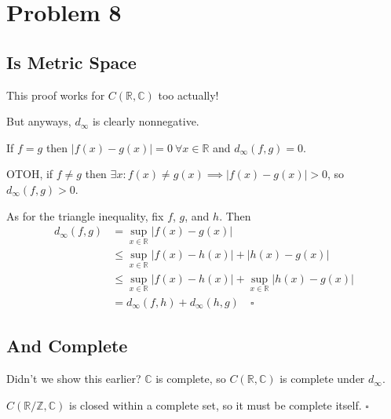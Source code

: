 \documentclass[12pt]{article}
\newcommand{\R}{\mathbb{R}}
\newcommand{\Z}{\mathbb{Z}}
\newcommand{\C}{\mathbb{C}}
\begin{document}
\section{Problem 8}

\subsection{Is Metric Space}

This proof works for $C(\R, \C)$ too actually!

But anyways, $d_\infty$ is clearly nonnegative.

If $f=g$ then $|f(x)-g(x)|=0\ \forall x \in \R$ and $d_\infty(f, g)=0$.

OTOH, if $f \ne g$ then $\exists x: f(x) \ne g(x) \implies |f(x)-g(x)| > 0$, so $d_\infty(f, g) > 0$.

As for the triangle inequality, fix $f$, $g$, and $h$.
Then
\begin{align*}
  d_\infty(f, g)
  &= \sup_{x \in \R} |f(x)-g(x)| \\
  &\le \sup_{x \in \R} |f(x)-h(x)|+|h(x)-g(x)| \\
  &\le \sup_{x \in \R} |f(x)-h(x)| + \sup_{x \in \R} |h(x)-g(x)| \\
  &= d_\infty(f, h) + d_\infty(h, g)\quad\square
\end{align*}

\subsection{And Complete}

Didn't we show this earlier?
$\C$ is complete, so $C(\R, \C)$ is complete under $d_\infty$.

$C(\R/\Z, \C)$ is closed within a complete set,
so it must be complete itself. $\square$
\end{document}

